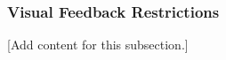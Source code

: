 
\subsubsection{Visual Feedback Restrictions}
\label{subsubsec:design_2_8_4_visual_feedback_restrictions}

[Add content for this subsection.]
